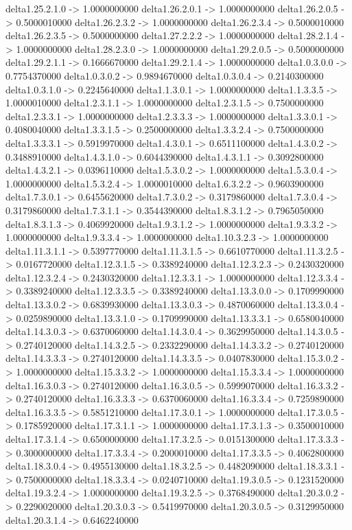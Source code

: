 delta1.25.2.1.0 -> 1.0000000000    delta1.26.2.0.1 -> 1.0000000000    delta1.26.2.0.5 -> 0.5000010000    delta1.26.2.3.2 -> 1.0000000000    delta1.26.2.3.4 -> 0.5000010000    delta1.26.2.3.5 -> 0.5000000000    delta1.27.2.2.2 -> 1.0000000000    delta1.28.2.1.4 -> 1.0000000000    delta1.28.2.3.0 -> 1.0000000000    delta1.29.2.0.5 -> 0.5000000000    delta1.29.2.1.1 -> 0.1666670000    delta1.29.2.1.4 -> 1.0000000000    delta1.0.3.0.0 -> 0.7754370000    delta1.0.3.0.2 -> 0.9894670000    delta1.0.3.0.4 -> 0.2140300000    delta1.0.3.1.0 -> 0.2245640000    delta1.1.3.0.1 -> 1.0000000000    delta1.1.3.3.5 -> 1.0000010000    delta1.2.3.1.1 -> 1.0000000000    delta1.2.3.1.5 -> 0.7500000000    delta1.2.3.3.1 -> 1.0000000000    delta1.2.3.3.3 -> 1.0000000000    delta1.3.3.0.1 -> 0.4080040000    delta1.3.3.1.5 -> 0.2500000000    delta1.3.3.2.4 -> 0.7500000000    delta1.3.3.3.1 -> 0.5919970000    delta1.4.3.0.1 -> 0.6511100000    delta1.4.3.0.2 -> 0.3488910000    delta1.4.3.1.0 -> 0.6044390000    delta1.4.3.1.1 -> 0.3092800000    delta1.4.3.2.1 -> 0.0396110000    delta1.5.3.0.2 -> 1.0000000000    delta1.5.3.0.4 -> 1.0000000000    delta1.5.3.2.4 -> 1.0000010000    delta1.6.3.2.2 -> 0.9603900000    delta1.7.3.0.1 -> 0.6455620000    delta1.7.3.0.2 -> 0.3179860000    delta1.7.3.0.4 -> 0.3179860000    delta1.7.3.1.1 -> 0.3544390000    delta1.8.3.1.2 -> 0.7965050000    delta1.8.3.1.3 -> 0.4069920000    delta1.9.3.1.2 -> 1.0000000000    delta1.9.3.3.2 -> 1.0000000000    delta1.9.3.3.4 -> 1.0000000000    delta1.10.3.2.3 -> 1.0000000000    delta1.11.3.1.1 -> 0.5397770000    delta1.11.3.1.5 -> 0.6610770000    delta1.11.3.2.5 -> 0.0167720000    delta1.12.3.1.5 -> 0.3389240000    delta1.12.3.2.3 -> 0.2430320000    delta1.12.3.2.4 -> 0.2430320000    delta1.12.3.3.1 -> 1.0000000000    delta1.12.3.3.4 -> 0.3389240000    delta1.12.3.3.5 -> 0.3389240000    delta1.13.3.0.0 -> 0.1709990000    delta1.13.3.0.2 -> 0.6839930000    delta1.13.3.0.3 -> 0.4870060000    delta1.13.3.0.4 -> 0.0259890000    delta1.13.3.1.0 -> 0.1709990000    delta1.13.3.3.1 -> 0.6580040000    delta1.14.3.0.3 -> 0.6370060000    delta1.14.3.0.4 -> 0.3629950000    delta1.14.3.0.5 -> 0.2740120000    delta1.14.3.2.5 -> 0.2332290000    delta1.14.3.3.2 -> 0.2740120000    delta1.14.3.3.3 -> 0.2740120000    delta1.14.3.3.5 -> 0.0407830000    delta1.15.3.0.2 -> 1.0000000000    delta1.15.3.3.2 -> 1.0000000000    delta1.15.3.3.4 -> 1.0000000000    delta1.16.3.0.3 -> 0.2740120000    delta1.16.3.0.5 -> 0.5999070000    delta1.16.3.3.2 -> 0.2740120000    delta1.16.3.3.3 -> 0.6370060000    delta1.16.3.3.4 -> 0.7259890000    delta1.16.3.3.5 -> 0.5851210000    delta1.17.3.0.1 -> 1.0000000000    delta1.17.3.0.5 -> 0.1785920000    delta1.17.3.1.1 -> 1.0000000000    delta1.17.3.1.3 -> 0.3500010000    delta1.17.3.1.4 -> 0.6500000000    delta1.17.3.2.5 -> 0.0151300000    delta1.17.3.3.3 -> 0.3000000000    delta1.17.3.3.4 -> 0.2000010000    delta1.17.3.3.5 -> 0.4062800000    delta1.18.3.0.4 -> 0.4955130000    delta1.18.3.2.5 -> 0.4482090000    delta1.18.3.3.1 -> 0.7500000000    delta1.18.3.3.4 -> 0.0240710000    delta1.19.3.0.5 -> 0.1231520000    delta1.19.3.2.4 -> 1.0000000000    delta1.19.3.2.5 -> 0.3768490000    delta1.20.3.0.2 -> 0.2290020000    delta1.20.3.0.3 -> 0.5419970000    delta1.20.3.0.5 -> 0.3129950000    delta1.20.3.1.4 -> 0.6462240000    